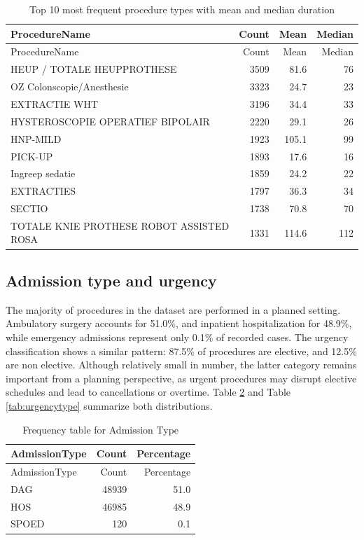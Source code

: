 \documentclass[
]{article}
\begin{document}
\begin{longtable}[]{@{}lrrr@{}}
\caption{Top 10 most frequent procedure types with mean and median
duration \label{tab:top10dur}}\tabularnewline
\toprule\noalign{}
ProcedureName & Count & Mean & Median \\
\midrule\noalign{}
\endfirsthead
\toprule\noalign{}
ProcedureName & Count & Mean & Median \\
\midrule\noalign{}
\endhead
\bottomrule\noalign{}
\endlastfoot
HEUP / TOTALE HEUPPROTHESE & 3509 & 81.6 & 76 \\
OZ Colonscopie/Anesthesie & 3323 & 24.7 & 23 \\
EXTRACTIE WHT & 3196 & 34.4 & 33 \\
HYSTEROSCOPIE OPERATIEF BIPOLAIR & 2220 & 29.1 & 26 \\
HNP-MILD & 1923 & 105.1 & 99 \\
PICK-UP & 1893 & 17.6 & 16 \\
Ingreep sedatie & 1859 & 24.2 & 22 \\
EXTRACTIES & 1797 & 36.3 & 34 \\
SECTIO & 1738 & 70.8 & 70 \\
TOTALE KNIE PROTHESE ROBOT ASSISTED ROSA & 1331 & 114.6 & 112 \\
\end{longtable}

\subsection{Admission type and
urgency}\label{admission-type-and-urgency}

The majority of procedures in the dataset are performed in a planned
setting. Ambulatory surgery accounts for 51.0\%, and inpatient
hospitalization for 48.9\%, while emergency admissions represent only
0.1\% of recorded cases. The urgency classification shows a similar
pattern: 87.5\% of procedures are elective, and 12.5\% are non elective.
Although relatively small in number, the latter category remains
important from a planning perspective, as urgent procedures may disrupt
elective schedules and lead to cancellations or overtime. Table
\ref{tab:admissiontype} and Table \ref{tab:urgencytype} summarize both
distributions.

\begin{longtable}[]{@{}lrr@{}}
\caption{Frequency table for Admission Type
\label{tab:admissiontype}}\tabularnewline
\toprule\noalign{}
AdmissionType & Count & Percentage \\
\midrule\noalign{}
\endfirsthead
\toprule\noalign{}
AdmissionType & Count & Percentage \\
\midrule\noalign{}
\endhead
\bottomrule\noalign{}
\endlastfoot
DAG & 48939 & 51.0 \\
HOS & 46985 & 48.9 \\
SPOED & 120 & 0.1 \\
\end{longtable}
\end{document}
